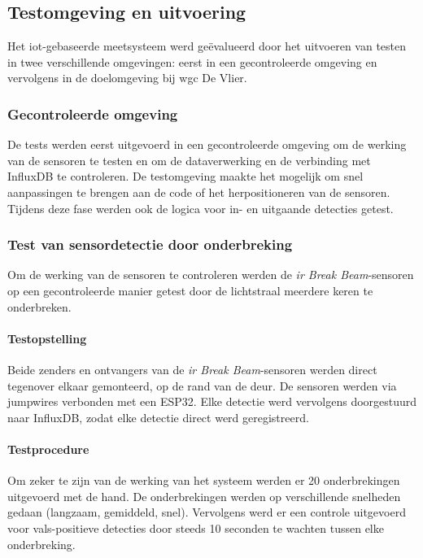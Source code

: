 \subsection{Testomgeving en uitvoering}
Het \gls{iot}-gebaseerde meetsysteem werd geëvalueerd door het uitvoeren van testen in twee verschillende omgevingen: eerst in een gecontroleerde omgeving en vervolgens in de doelomgeving bij \gls{wgc} De Vlier.

\subsubsection{Gecontroleerde omgeving}
De tests werden eerst uitgevoerd in een gecontroleerde omgeving om de werking van de sensoren te testen en om de dataverwerking en de verbinding met InfluxDB te controleren. De testomgeving maakte het mogelijk om snel aanpassingen te brengen aan de code of het herpositioneren van de sensoren. Tijdens deze fase werden ook de logica voor in- en uitgaande detecties getest.

\subsubsection{Test van sensordetectie door onderbreking} \label{test1}
Om de werking van de sensoren te controleren werden de \textit{\gls{ir} Break Beam}-sensoren op een gecontroleerde manier getest door de lichtstraal meerdere keren te onderbreken.

\paragraph{Testopstelling} \label{opstelling}
Beide zenders en ontvangers van de \textit{\gls{ir} Break Beam}-sensoren werden direct tegenover elkaar gemonteerd, op de rand van de deur. De sensoren werden via jumpwires verbonden met een ESP32. Elke detectie werd vervolgens doorgestuurd naar InfluxDB, zodat elke detectie direct werd geregistreerd.

\paragraph{Testprocedure} \label{testprocedure}
Om zeker te zijn van de werking van het systeem werden er 20 onderbrekingen uitgevoerd met de hand. De onderbrekingen werden op verschillende snelheden gedaan (langzaam, gemiddeld, snel). Vervolgens werd er een controle uitgevoerd voor vals-positieve detecties door steeds 10 seconden te wachten tussen elke onderbreking.

